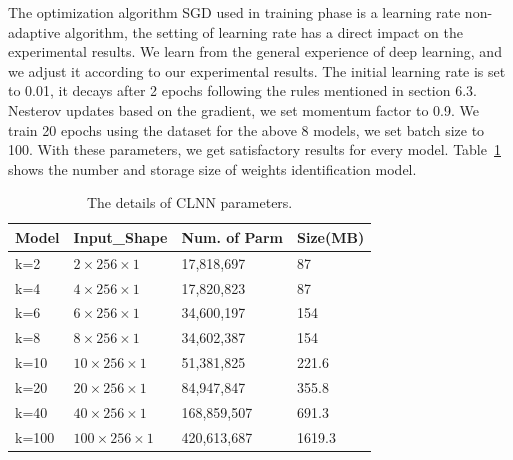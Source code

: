 \documentclass[conference]{IEEEtran}
\begin{document}
The optimization algorithm SGD used in training phase is a learning rate non-adaptive algorithm, the setting of learning rate has a direct impact on the experimental results. We learn from the general experience of deep learning, and we adjust it according to our experimental results. The initial learning rate is set to 0.01, it decays after 2 epochs following the rules mentioned in section 6.3.  Nesterov updates based on the gradient, we set momentum factor to 0.9. We train 20 epochs using the dataset for the above 8 models, we set batch size to 100. With these parameters, we get satisfactory results for every model. Table~\ref{tab:params} shows the number and storage size of weights identification model.
\begin{table}
  \caption{The details of CLNN parameters.}
  \label{tab:params}
  \centering
  \begin{tabular}{l l l l}
    \hline
    \textbf{Model} & \textbf{Input\_Shape} & \textbf{Num. of Parm}&\textbf{Size(MB)}\\
    \hline
    k=2      & ${2 \times 256 \times 1}$  & 17,818,697  &87  \\
    k=4      & ${4 \times 256 \times 1}$  & 17,820,823  &87  \\
    k=6      & ${6 \times 256 \times 1}$  & 34,600,197  &154  \\
    k=8      & ${8 \times 256 \times 1}$  & 34,602,387  &154 \\
    k=10     & ${10 \times 256 \times 1}$  & 51,381,825  &221.6  \\
    k=20     & ${20 \times 256 \times 1}$  & 84,947,847  &355.8 \\
    k=40     & ${40 \times 256 \times 1}$  & 168,859,507  &691.3  \\
    k=100    & ${100 \times 256 \times 1}$  & 420,613,687  &1619.3  \\
    \hline
  \end{tabular}
\end{table}
\end{document}
